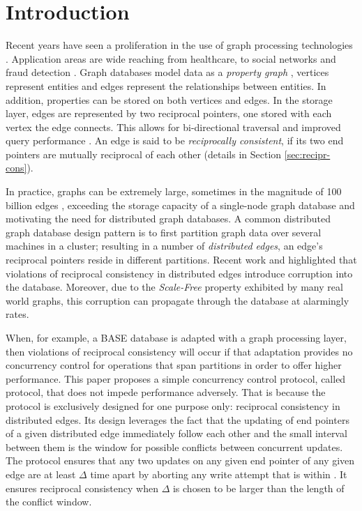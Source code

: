 \section{Introduction}
\label{sec:introduction}

Recent years have seen a proliferation in the use of graph processing technologies \cite{Besta2019}. Application areas are wide reaching from healthcare, to social networks and fraud detection \cite{Eifrem2016}. Graph databases model data as a \textit{property graph} \cite{Robinson2015}, vertices represent entities and edges represent the relationships between entities. In addition, properties can be stored on both vertices and edges. In the storage layer, edges are represented by two reciprocal pointers, one stored with each vertex the edge connects. This allows for bi-directional traversal and improved query performance \cite{Robinson2015}. An edge is said to be \emph{reciprocally consistent}, if its two end pointers are mutually reciprocal of each other (details in Section \ref{sec:recipr-cons}).

In practice, graphs can be extremely large, sometimes in the magnitude of 100 billion edges \cite{Sahu2017}, exceeding the storage capacity of a single-node graph database and motivating the need for distributed graph databases. A common distributed graph database design pattern is to first partition graph data over several machines in a cluster; resulting in a number of \emph{distributed edges}, an edge's reciprocal pointers reside in different partitions. Recent work \cite{Ezhilchelvan2018} and \cite{Webber2019} highlighted that violations of reciprocal consistency in distributed edges introduce corruption into the database. Moreover, due to the \emph{Scale-Free} \cite{ScaleFree} property exhibited by many real world graphs, this corruption can propagate through the database at alarmingly rates.

When, for example, a BASE database \cite{Pritchett2008} is adapted with a graph processing layer, then violations of reciprocal consistency will occur if that adaptation provides no concurrency control for operations that span partitions in order to offer higher performance. This paper proposes a simple concurrency control protocol, called \tDelta protocol, that does not impede performance adversely. That is because the protocol is exclusively designed for one purpose only: reciprocal consistency in distributed edges.  Its design leverages the fact that the updating of end pointers of a given distributed edge immediately follow each other and the small interval between them is the window for possible conflicts between concurrent updates. The protocol ensures that any two updates on any given end pointer of any given edge are at least $\Delta$ time apart by aborting any write attempt that is within . It ensures reciprocal consistency when $\Delta$ is chosen to be larger than the length of the conflict window.

